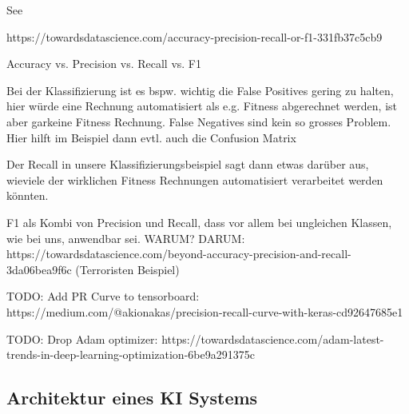 See \textcite{MLYearning}


https://towardsdatascience.com/accuracy-precision-recall-or-f1-331fb37c5cb9

Accuracy vs. Precision vs. Recall vs. F1

Bei der Klassifizierung ist es bspw. wichtig die False Positives gering zu halten, hier würde eine Rechnung automatisiert als e.g. Fitness abgerechnet werden, ist aber garkeine Fitness Rechnung. False Negatives sind kein so grosses Problem. Hier hilft im Beispiel dann evtl. auch die Confusion Matrix

Der Recall in unsere Klassifizierungsbeispiel sagt dann etwas darüber aus, wieviele der wirklichen Fitness Rechnungen automatisiert verarbeitet werden könnten.

F1 als Kombi von Precision und Recall, dass vor allem bei ungleichen Klassen, wie bei uns, anwendbar sei. WARUM? DARUM: https://towardsdatascience.com/beyond-accuracy-precision-and-recall-3da06bea9f6c (Terroristen Beispiel)

TODO: Add PR Curve to tensorboard: https://medium.com/@akionakas/precision-recall-curve-with-keras-cd92647685e1

TODO: Drop Adam optimizer: https://towardsdatascience.com/adam-latest-trends-in-deep-learning-optimization-6be9a291375c

\subsection{Architektur eines KI Systems}



